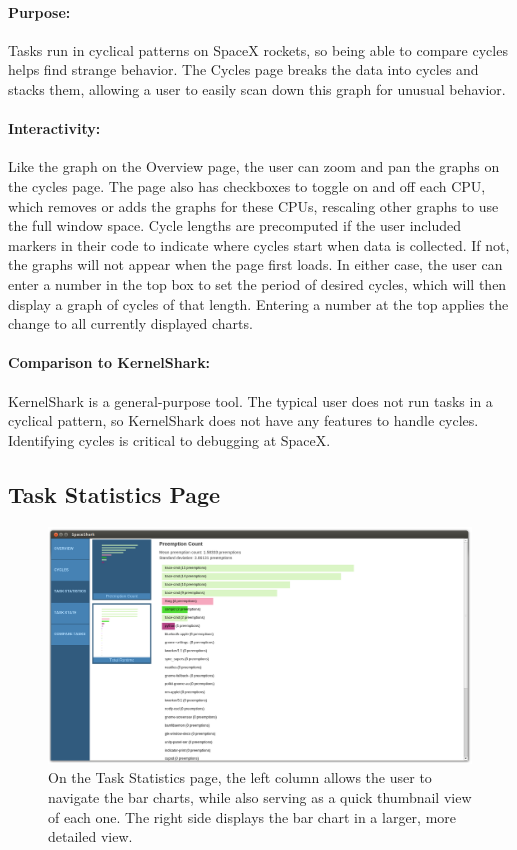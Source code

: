 \documentclass{hmcclinic}
\begin{document}
  \paragraph{Purpose:}Tasks run in cyclical patterns on SpaceX rockets, so being
  able to compare cycles helps find strange behavior. The Cycles page breaks the
  data into cycles and stacks them, allowing a user to easily scan down this
  graph for unusual behavior.

\paragraph{Interactivity:}    
    Like the graph on the Overview page, the user can zoom and pan the graphs on
    the cycles page.  The page also has checkboxes to toggle on and off each
    CPU, which removes or adds the graphs for these CPUs, rescaling other graphs
    to use the full window space. Cycle lengths are precomputed if the user
    included markers in their code to indicate where cycles start when data is
    collected.  If not, the graphs will not appear when the page first loads.
    In either case, the user can enter a number in the top box to set the period
    of desired cycles, which will then display a graph of cycles of that length.
    Entering a number at the top applies the change to all currently displayed
    charts.
        
\paragraph{Comparison to KernelShark:}
    KernelShark is a general-purpose tool. The typical user does not run tasks
    in a cyclical pattern, so KernelShark does not have any features to handle
    cycles. Identifying cycles is critical to debugging at SpaceX.
    
  \subsection{Task Statistics Page} %

  \begin{figure}[H]
  \includegraphics[width=5in]{task-statistics-page.png}
  \caption{On the Task Statistics page, the left column allows the user to navigate the bar charts, while
    also serving as a quick thumbnail view of each one. The right side displays
  the bar chart in a larger, more detailed view.}
  \end{figure}
\end{document}
